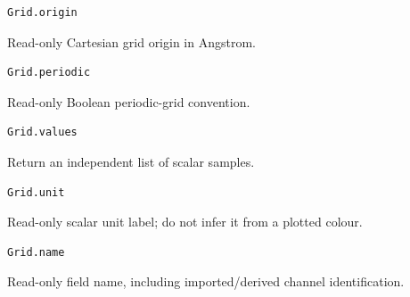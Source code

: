 \begin{samepage}

\begin{lstlisting}[language=Python]
Grid.origin
\end{lstlisting}

Read-only Cartesian grid origin in Angstrom.

\end{samepage}



\begin{samepage}

\begin{lstlisting}[language=Python]
Grid.periodic
\end{lstlisting}

Read-only Boolean periodic-grid convention.

\end{samepage}



\begin{samepage}

\begin{lstlisting}[language=Python]
Grid.values
\end{lstlisting}

Return an independent list of scalar samples.

\end{samepage}



\begin{samepage}

\begin{lstlisting}[language=Python]
Grid.unit
\end{lstlisting}

Read-only scalar unit label; do not infer it from a plotted colour.

\end{samepage}



\begin{samepage}

\begin{lstlisting}[language=Python]
Grid.name
\end{lstlisting}

Read-only field name, including imported/\allowbreak{}derived channel identification.

\end{samepage}




